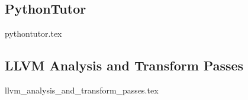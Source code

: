\subsection{PythonTutor}
\label{sec:related_work:pythontutor}
{pythontutor.tex}

\subsection{LLVM Analysis and Transform Passes}
\label{sec:related_work:llvm}
{llvm_analysis_and_transform_passes.tex}

